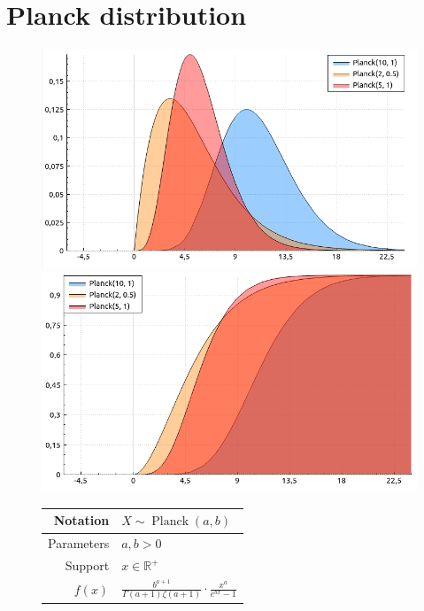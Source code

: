 \documentclass[a4paper,11pt]{article}
\theoremstyle{plain}
\theoremstyle{definition}
\newcommand{\MR}{\mathbb{R}}
\begin{document}
	
	\pagebreak
	\section{Planck distribution}
	
	\begin{figure}[!htb]\centering
		\begin{minipage}{0.55\textwidth}
			\includegraphics[width=\linewidth, right]{planck_pdf}
			\captionsetup{labelformat=empty}
			\includegraphics[width=\linewidth, right]{planck_cdf}
			\captionsetup{labelformat=empty}
		\end{minipage}
		\begin{minipage}{0.4\textwidth}
		\begin{tabular}{| r | l |}
			\hline
			Notation & $X \sim \operatorname{Planck}(a, b)$ \\
			\hline
			Parameters & $a, b > 0$ \\
			\hline
			Support & $ x \in \MR^+$  \\
			\hline
			$f(x)$ & $\frac{b^{a+1}}{\Gamma(a+1)\zeta(a+1)} \cdot \frac{x ^ a}{e^{bx} - 1}$ \\

\end{tabular}
\end{minipage}
\end{figure}
\end{document}
